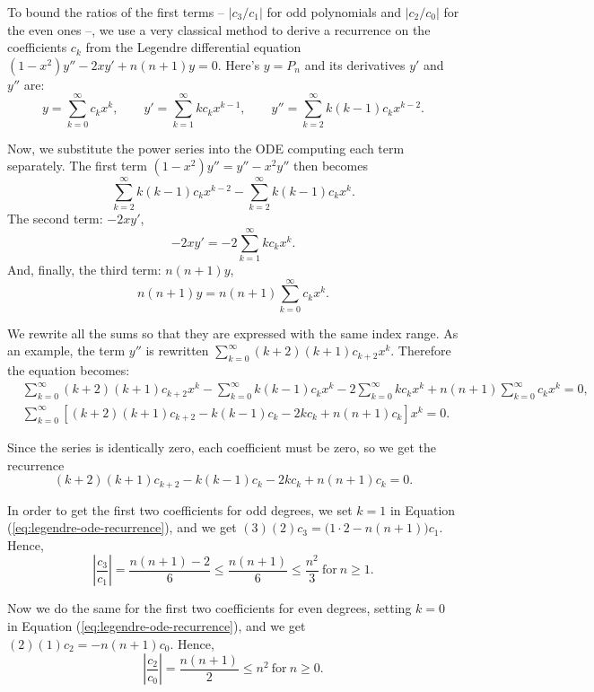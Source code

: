 \documentclass[12pt]{amsart}
\begin{document}
To bound the ratios of the first terms -- $|c_3/c_1|$ for odd polynomials and
$|c_2/c_0|$ for the even ones --, we use a very classical method to derive a
recurrence on the coefficients $c_k$ from the Legendre differential equation
$(1-x^2)y'' - 2x y' + n(n+1) y = 0$. Here's $y = P_n$ and its derivatives
$y'$ and $y''$ are:
\[
  y   = \sum_{k=0}^{\infty} c_k x^k,             \qquad
  y'  = \sum_{k=1}^{\infty} k c_k x^{k-1},       \qquad
  y'' = \sum_{k=2}^{\infty} k (k-1) c_k x^{k-2}.
\]

Now, we substitute the power series into the ODE computing each term separately.
The first term $(1 - x^2)y'' = y'' - x^2 y''$ then becomes
\[
  \sum_{k=2}^{\infty} k(k-1)c_k x^{k-2} - 
  \sum_{k=2}^{\infty} k(k-1)c_k x^k.
\]
The second term: $-2x y'$,
\[
  -2x y' = -2 \sum_{k=1}^{\infty} k c_k x^k.
\]
And, finally, the third term: $n(n+1)y$,
\[
  n(n+1)y = n(n+1)\sum_{k=0}^{\infty} c_k x^k.
\]

We rewrite all the sums so that they are expressed with the same index range.
As an example, the term $y''$ is rewritten
$\sum_{k=0}^{\infty} (k+2)(k+1)c_{k+2} x^k$. Therefore
the equation becomes:
\begin{align*}
  &\sum_{k=0}^{\infty} (k+2)(k+1)c_{k+2} x^k
  - \sum_{k=0}^{\infty} k(k-1)c_k x^k
  - 2 \sum_{k=0}^{\infty} k c_k x^k
  + n(n+1)\sum_{k=0}^{\infty} c_k x^k = 0, \\
  &\sum_{k=0}^{\infty}
  \left[
    (k+2)(k+1)c_{k+2}
    - k(k-1)c_k
    - 2k c_k
    + n(n+1)c_k
  \right] x^k = 0.
\end{align*}

Since the series is identically zero, each coefficient must be zero, so we
get the recurrence
\begin{equation} \label{eq:legendre-ode-recurrence}
  (k+2)(k+1)c_{k+2}
  - k(k-1)c_k
  - 2k c_k
  + n(n+1)c_k = 0.
\end{equation}

In order to get the first two coefficients for odd degrees, we set $k = 1$
in Equation (\ref{eq:legendre-ode-recurrence}), and we get
$(3)(2)c_3 = \big(1 \cdot 2 - n(n+1)\big)c_1$. Hence,
\[
  \left|\frac{c_3}{c_1}\right| = \frac{n(n+1) - 2}{6}
                               \le \frac{n(n+1)}{6}
                               \le \frac{n^2}{3}~\mathrm{for}~n \ge 1.
\]

Now we do the same for the first two coefficients for even degrees,
setting $k = 0$ in Equation (\ref{eq:legendre-ode-recurrence}), and we
get $(2)(1)c_2 = - n(n+1)c_0$. Hence,
\[
  \left|\frac{c_2}{c_0}\right| = \frac{n(n+1)}{2}
                               \le n^2~\mathrm{for}~n \ge 0.
\]
\end{document}
